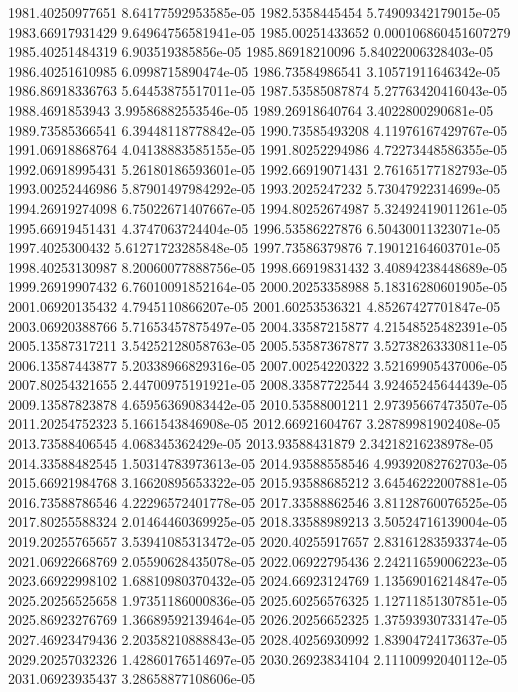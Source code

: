 {1981.40250977651 8.64177592953585e-05
1982.5358445454 5.74909342179015e-05
1983.66917931429 9.64964756581941e-05
1985.00251433652 0.000106860451607279
1985.40251484319 6.903519385856e-05
1985.86918210096 5.84022006328403e-05
1986.40251610985 6.0998715890474e-05
1986.73584986541 3.10571911646342e-05
1986.86918336763 5.64453875517011e-05
1987.53585087874 5.27763420416043e-05
1988.4691853943 3.99586882553546e-05
1989.26918640764 3.4022800290681e-05
1989.73585366541 6.39448118778842e-05
1990.73585493208 4.11976167429767e-05
1991.06918868764 4.04138883585155e-05
1991.80252294986 4.72273448586355e-05
1992.06918995431 5.26180186593601e-05
1992.66919071431 2.76165177182793e-05
1993.00252446986 5.87901497984292e-05
1993.2025247232 5.73047922314699e-05
1994.26919274098 6.75022671407667e-05
1994.80252674987 5.32492419011261e-05
1995.66919451431 4.3747063724404e-05
1996.53586227876 6.50430011323071e-05
1997.4025300432 5.61271723285848e-05
1997.73586379876 7.19012164603701e-05
1998.40253130987 8.20060077888756e-05
1998.66919831432 3.40894238448689e-05
1999.26919907432 6.76010091852164e-05
2000.20253358988 5.18316280601905e-05
2001.06920135432 4.7945110866207e-05
2001.60253536321 4.85267427701847e-05
2003.06920388766 5.71653457875497e-05
2004.33587215877 4.21548525482391e-05
2005.13587317211 3.54252128058763e-05
2005.53587367877 3.52738263330811e-05
2006.13587443877 5.20338966829316e-05
2007.00254220322 3.52169905437006e-05
2007.80254321655 2.44700975191921e-05
2008.33587722544 3.92465245644439e-05
2009.13587823878 4.65956369083442e-05
2010.53588001211 2.97395667473507e-05
2011.20254752323 5.1661543846908e-05
2012.66921604767 3.28789981902408e-05
2013.73588406545 4.068345362429e-05
2013.93588431879 2.34218216238978e-05
2014.33588482545 1.50314783973613e-05
2014.93588558546 4.99392082762703e-05
2015.66921984768 3.16620895653322e-05
2015.93588685212 3.64546222007881e-05
2016.73588786546 4.22296572401778e-05
2017.33588862546 3.81128760076525e-05
2017.80255588324 2.01464460369925e-05
2018.33588989213 3.50524716139004e-05
2019.20255765657 3.53941085313472e-05
2020.40255917657 2.83161283593374e-05
2021.06922668769 2.05590628435078e-05
2022.06922795436 2.24211659006223e-05
2023.66922998102 1.68810980370432e-05
2024.66923124769 1.13569016214847e-05
2025.20256525658 1.97351186000836e-05
2025.60256576325 1.12711851307851e-05
2025.86923276769 1.36689592139464e-05
2026.20256652325 1.37593930733147e-05
2027.46923479436 2.20358210888843e-05
2028.40256930992 1.83904724173637e-05
2029.20257032326 1.42860176514697e-05
2030.26923834104 2.11100992040112e-05
2031.06923935437 3.28658877108606e-05
}
